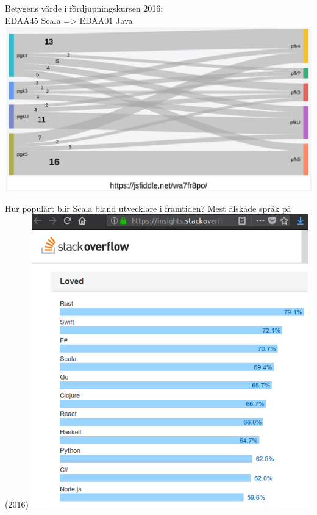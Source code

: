 \begin{Slide}{Betygens värde i fördjupningskursen 2016:\\EDAA45 Scala => EDAA01 Java}
\href{https://jsfiddle.net/wa7fr8po/}{\includegraphics[width=1.05\textwidth]{../about/course-experience-first-year/img/2016}}
\end{Slide}





\begin{Slide}{Hur populärt blir Scala bland utvecklare i framtiden?}
Mest älskade språk på  (2016)
\includegraphics[width=0.9\textwidth]{../img/w14/most-loved-2016.png}
\end{Slide}

